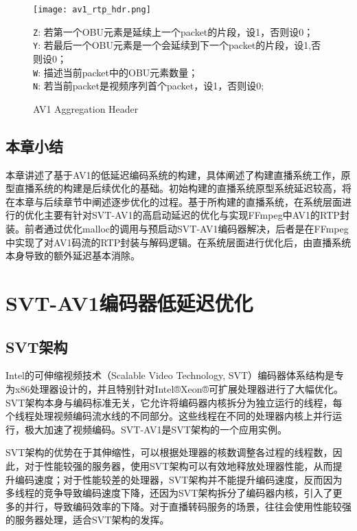   \begin{figure}[!htp]
    \centering
    \texttt{[image: av1\_rtp\_hdr.png]} \\
    \raggedright
      \texttt{Z}: 若第一个OBU元素是延续上一个packet的片段，设1，否则设0；\\
      \texttt{Y}: 若最后一个OBU元素是一个会延续到下一个packet的片段，设1,否则设0；\\
      \texttt{W}: 描述当前packet中的OBU元素数量；\\
      \texttt{N}: 若当前packet是视频序列首个packet，设1，否则设0;\\
    \caption{AV1 Aggregation Header}
   \label{fig:av1rtp-aggr}
  \end{figure}

\section{本章小结}
  本章讲述了基于AV1的低延迟编码系统的构建，具体阐述了构建直播系统工作，原型直播系统的构建是后续优化的基础。初始构建的直播系统原型系统延迟较高，将在本章与后续章节中阐述逐步优化的过程。基于所构建的直播系统，在系统层面进行的优化主要有针对SVT-AV1的高启动延迟的优化与实现FFmpeg中AV1的RTP封装。前者通过优化malloc的调用与预启动SVT-AV1编码器解决，后者是在FFmpeg中实现了对AV1码流的RTP封装与解码逻辑。在系统层面进行优化后，由直播系统本身导致的额外延迟基本消除。


\chapter{SVT-AV1编码器低延迟优化}

\section{SVT架构}
  Intel的可伸缩视频技术（Scalable Video Technology, SVT）\cite{awsScalableVideoTechnology2019}编码器体系结构是专为x86处理器设计的，并且特别针对Intel®Xeon®可扩展处理器进行了大幅优化。SVT架构本身与编码标准无关，它允许将编码器内核拆分为独立运行的线程，每个线程处理视频编码流水线的不同部分。这些线程在不同的处理器内核上并行运行，极大加速了视频编码。SVT-AV1是SVT架构的一个应用实例。

  SVT架构的优势在于其伸缩性，可以根据处理器的核数调整各过程的线程数，因此，对于性能较强的服务器，使用SVT架构可以有效地释放处理器性能，从而提升编码速度；对于性能较差的处理器，SVT架构并不能提升编码速度，反而因为多线程的竞争导致编码速度下降，还因为SVT架构拆分了编码器内核，引入了更多的并行，导致编码效率的下降。对于直播转码服务的场景，往往会使用性能较强的服务器处理，适合SVT架构的发挥。

